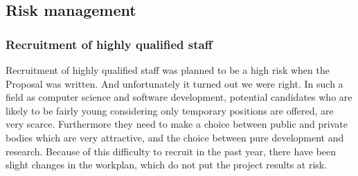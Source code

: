 \subsection{Risk management}
\label{section.risk_management}
\subsubsection{Recruitment of highly qualified staff}






Recruitment of highly qualified staff was planned to be a high risk
when the Proposal was written. And unfortunately it turned out we were
right. In such a field as computer science and software development,
potential candidates who are likely to be fairly young considering
only temporary positions are offered, are very scarce. Furthermore
they need to make a choice between public and private bodies which are
very attractive, and the choice between pure development and research.
Because of this difficulty to recruit in the past year, there have
been slight changes in the workplan, which do
not put the project results at risk.

